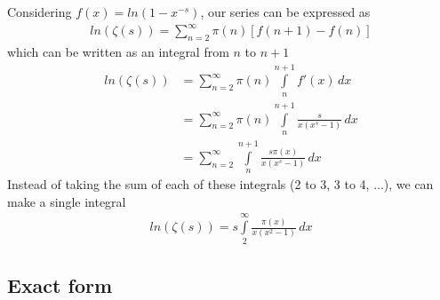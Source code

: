 \documentclass{article}
\begin{document}
Considering $f(x)=ln(1-x^{-s})$, our series can be expressed as
\begin{align*}
    ln\left(\zeta(s)\right)=
    \sum_{n=2}^{\infty}\pi(n)\left[f(n+1)-f(n)\right]
\end{align*}
which can be written as an integral from $n$ to $n+1$
\begin{align*}
    ln\left(\zeta(s)\right)&=
    \sum_{n=2}^{\infty}\pi(n)
    \int\limits_n^{n+1} f'(x)\,dx
    \\
    &=
    \sum_{n=2}^{\infty}\pi(n)
    \int\limits_n^{n+1}
    \frac{s}{x(x^s-1)}\,dx
    \\
    &=
    \sum_{n=2}^{\infty}
    \int\limits_n^{n+1}
    \frac{s\pi(x)}{x(x^s-1)}\,dx
\end{align*}
Instead of taking the sum of each of these integrals (2 to 3, 3 to 4, ...), we can make a single integral
\begin{align*}
    ln\left(\zeta(s)\right)=
    s\int\limits_2^\infty
    \frac{\pi(x)}{x(x^2-1)}\,dx
\end{align*}

\pagebreak

\subsection{Exact form}
\end{document}

